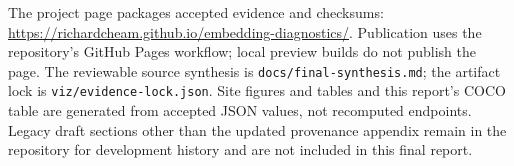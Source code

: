 \documentclass[11pt]{article}
\begin{document}
The project page packages accepted evidence and checksums:
\url{https://richardcheam.github.io/embedding-diagnostics/}.
Publication uses the repository's GitHub Pages workflow; local preview builds
do not publish the page.
The reviewable source synthesis is \texttt{docs/final-synthesis.md}; the artifact
lock is \texttt{viz/evidence-lock.json}. Site figures and tables and this report's
COCO table are generated from accepted JSON values, not recomputed endpoints.
Legacy draft sections other than the updated provenance appendix remain in the repository for development history and are
not included in this final report.


\appendix

\end{document}
